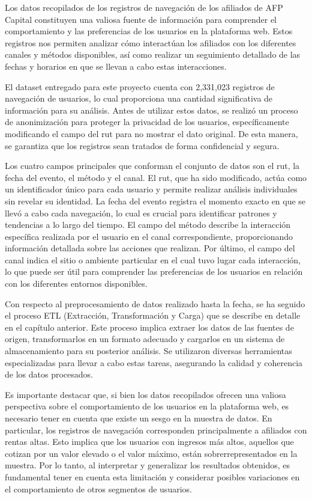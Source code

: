 Los datos recopilados de los registros de navegación de los afiliados de AFP Capital constituyen una valiosa fuente de información para comprender el comportamiento y las preferencias de los usuarios en la plataforma web. Estos registros nos permiten analizar cómo interactúan los afiliados con los diferentes canales y métodos disponibles, así como realizar un seguimiento detallado de las fechas y horarios en que se llevan a cabo estas interacciones.

El dataset entregado para este proyecto cuenta con 2,331,023 registros de navegación de usuarios, lo cual proporciona una cantidad significativa de información para su análisis. Antes de utilizar estos datos, se realizó un proceso de anonimización para proteger la privacidad de los usuarios, específicamente modificando el campo del rut para no mostrar el dato original. De esta manera, se garantiza que los registros sean tratados de forma confidencial y segura.

Los cuatro campos principales que conforman el conjunto de datos son el rut, la fecha del evento, el método y el canal. El rut, que ha sido modificado, actúa como un identificador único para cada usuario y permite realizar análisis individuales sin revelar su identidad. La fecha del evento registra el momento exacto en que se llevó a cabo cada navegación, lo cual es crucial para identificar patrones y tendencias a lo largo del tiempo. El campo del método describe la interacción específica realizada por el usuario en el canal correspondiente, proporcionando información detallada sobre las acciones que realizan. Por último, el campo del canal indica el sitio o ambiente particular en el cual tuvo lugar cada interacción, lo que puede ser útil para comprender las preferencias de los usuarios en relación con los diferentes entornos disponibles.

Con respecto al preprocesamiento de datos realizado hasta la fecha, se ha seguido el proceso ETL (Extracción, Transformación y Carga) que se describe en detalle en el capítulo anterior. Este proceso implica extraer los datos de las fuentes de origen, transformarlos en un formato adecuado y cargarlos en un sistema de almacenamiento para su posterior análisis. Se utilizaron diversas herramientas especializadas para llevar a cabo estas tareas, asegurando la calidad y coherencia de los datos procesados.

Es importante destacar que, si bien los datos recopilados ofrecen una valiosa perspectiva sobre el comportamiento de los usuarios en la plataforma web, es necesario tener en cuenta que existe un sesgo en la muestra de datos. En particular, los registros de navegación corresponden principalmente a afiliados con rentas altas. Esto implica que los usuarios con ingresos más altos, aquellos que cotizan por un valor elevado o el valor máximo, están sobrerrepresentados en la muestra. Por lo tanto, al interpretar y generalizar los resultados obtenidos, es fundamental tener en cuenta esta limitación y considerar posibles variaciones en el comportamiento de otros segmentos de usuarios.